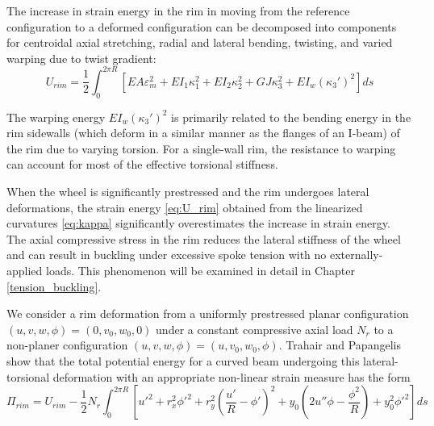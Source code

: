 \documentclass[\rootdir/thesis.tex]{subfiles}
\begin{document}
The increase in strain energy in the rim in moving from the reference configuration to a deformed configuration can be decomposed into components for centroidal axial stretching, radial and lateral bending, twisting, and varied warping due to twist gradient:
\begin{equation}
\label{eq:U_rim}
U_{rim} = \frac{1}{2} \int_0^{2\pi R}[EA\varepsilon_m^2 + EI_1\kappa_1^2+EI_2\kappa_2^2 + GJ\kappa_3^2 + EI_w(\kappa_3')^2]ds
\end{equation}

The warping energy $EI_w(\kappa_3')^2$ is primarily related to the bending energy in the rim sidewalls (which deform in a similar manner as the flanges of an I-beam) of the rim due to varying torsion. For a single-wall rim, the resistance to warping can account for most of the effective torsional stiffness.

When the wheel is significantly prestressed and the rim undergoes lateral deformations, the strain energy \eqref{eq:U_rim} obtained from the linearized curvatures \eqref{eq:kappa} significantly overestimates the increase in strain energy. The axial compressive stress in the rim reduces the lateral stiffness of the wheel and can result in buckling under excessive spoke tension with no externally-applied loads. This phenomenon will be examined in detail in Chapter \ref{tension_buckling}.

We consider a rim deformation from a uniformly prestressed planar configuration $(u,v,w,\phi) = (0,v_0,w_0,0)$  under a constant compressive axial load $N_r$ to a non-planer configuration $(u,v,w,\phi) = (u,v_0,w_0,\phi)$. Trahair and Papangelis show that the total potential energy for a curved beam undergoing this lateral-torsional deformation with an appropriate non-linear strain measure has the form \cite{Trahair1987}
\begin{equation}
\label{eq:V_rim}
\Pi_{rim} = U_{rim} - \frac{1}{2}N_r \int_0^{2\pi R}
	\left[u'^2 + r_x^2\phi'^2 + r_y^2\left(\frac{u'}{R} - \phi'\right)^2
	      + y_0\left(2u''\phi - \frac{\phi^2}{R}\right) + y_0^2\phi'^2 \right]ds
\end{equation}
\end{document}
